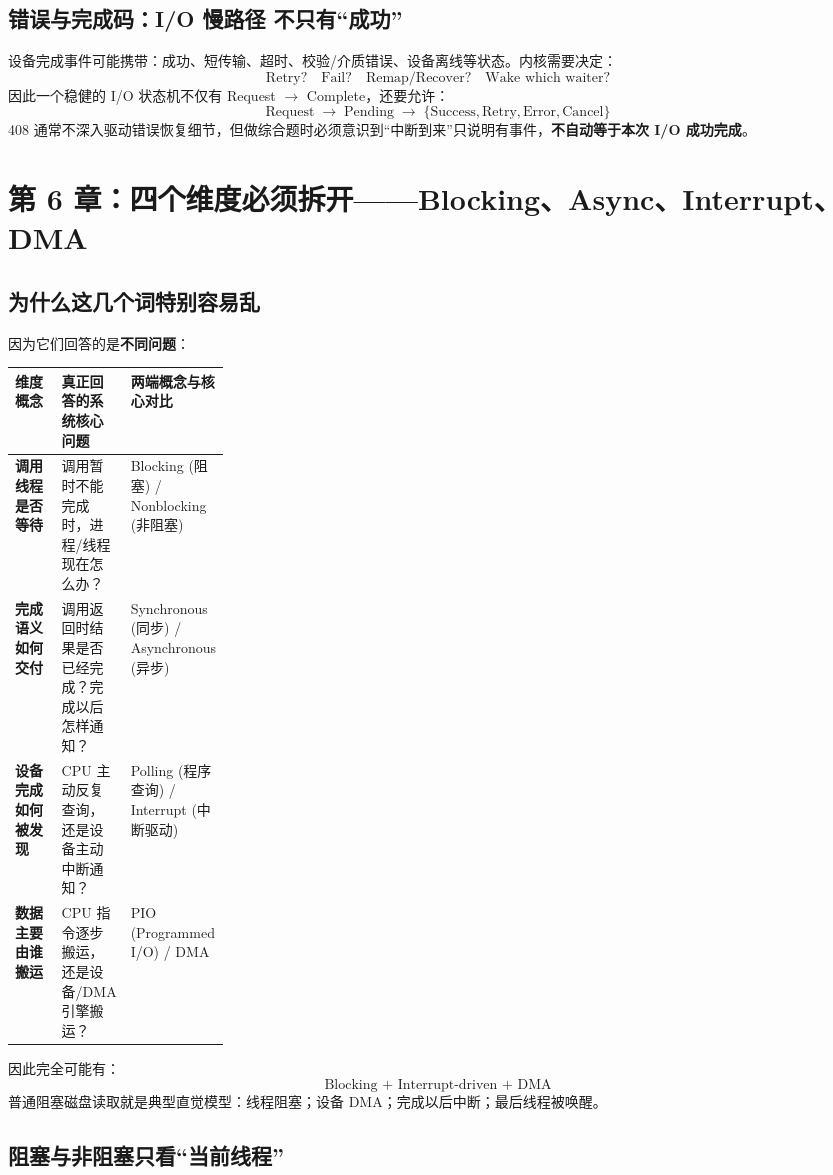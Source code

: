 \documentclass[UTF8,fontset=fandol,11pt,a4paper]{ctexart}
\newcommand{\kw}[1]{\textbf{#1}}
\newcommand{\arr}{\;\longrightarrow\;}
\begin{document}
\subsection{错误与完成码：I/O 慢路径 不只有“成功”}
设备完成事件可能携带：成功、短传输、超时、校验/介质错误、设备离线等状态。内核需要决定：
\[
\text{Retry?}\quad\text{Fail?}\quad\text{Remap/Recover?}\quad\text{Wake which waiter?}
\]
因此一个稳健的 I/O 状态机不仅有 Request $\to$ Complete，还要允许：
\[
\boxed{\text{Request}\arr\text{Pending}\arr\{\text{Success},\text{Retry},\text{Error},\text{Cancel}\}}
\]
408 通常不深入驱动错误恢复细节，但做综合题时必须意识到“中断到来”只说明有事件，\kw{不自动等于本次 I/O 成功完成}。

\section{第 6 章：四个维度必须拆开——Blocking、Async、Interrupt、DMA}

\subsection{为什么这几个词特别容易乱}
因为它们回答的是\kw{不同问题}：

\begingroup
\small
\renewcommand{\arraystretch}{1.25}
\setlength{\tabcolsep}{6pt}
\begin{tabularx}{\linewidth}{>{\bfseries}p{0.25\linewidth} X X}
\toprule
维度概念 & 真正回答的系统核心问题 & 两端概念与核心对比 \\
\midrule
调用线程是否等待 & 调用暂时不能完成时，进程/线程现在怎么办？ & Blocking (阻塞) / Nonblocking (非阻塞) \\
完成语义如何交付 & 调用返回时结果是否已经完成？完成以后怎样通知？ & Synchronous (同步) / Asynchronous (异步) \\
设备完成如何被发现 & CPU 主动反复查询，还是设备主动中断通知？ & Polling (程序查询) / Interrupt (中断驱动) \\
数据主要由谁搬运 & CPU 指令逐步搬运，还是设备/DMA 引擎搬运？ & PIO (Programmed I/O) / DMA \\
\bottomrule
\end{tabularx}
\endgroup

因此完全可能有：
\[
\boxed{\text{Blocking + Interrupt-driven + DMA}}
\]
普通阻塞磁盘读取就是典型直觉模型：线程阻塞；设备 DMA；完成以后中断；最后线程被唤醒。

\subsection{阻塞与非阻塞只看“当前线程”}
\end{document}
